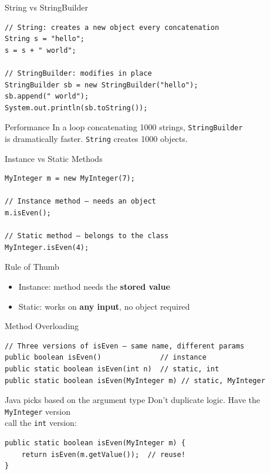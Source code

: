 \documentclass{beamer}
\begin{document}
\begin{frame}[fragile]{String vs StringBuilder}
  \begin{lstlisting}
// String: creates a new object every concatenation
String s = "hello";
s = s + " world";

// StringBuilder: modifies in place
StringBuilder sb = new StringBuilder("hello");
sb.append(" world");
System.out.println(sb.toString());
  \end{lstlisting}
  \begin{alertblock}{Performance}
    In a loop concatenating 1000 strings, \texttt{StringBuilder}\\
    is dramatically faster. \texttt{String} creates 1000 objects.
  \end{alertblock}
\end{frame}

\begin{frame}[fragile]{Instance vs Static Methods}
  \begin{lstlisting}
MyInteger m = new MyInteger(7);

// Instance method — needs an object
m.isEven();

// Static method — belongs to the class
MyInteger.isEven(4);
  \end{lstlisting}
  \begin{block}{Rule of Thumb}
    \begin{itemize}
      \item Instance: method needs the \textbf{stored value}
      \item Static: works on \textbf{any input}, no object required
    \end{itemize}
  \end{block}
\end{frame}

\begin{frame}[fragile]{Method Overloading}
  \begin{lstlisting}
// Three versions of isEven — same name, different params
public boolean isEven()              // instance
public static boolean isEven(int n)  // static, int
public static boolean isEven(MyInteger m) // static, MyInteger
  \end{lstlisting}
  \begin{block}{Java picks based on the argument type}
    Don't duplicate logic. Have the \texttt{MyInteger} version\\
    call the \texttt{int} version:
  \end{block}
  \begin{lstlisting}
public static boolean isEven(MyInteger m) {
    return isEven(m.getValue());  // reuse!
}
  \end{lstlisting}
\end{frame}
\end{document}
